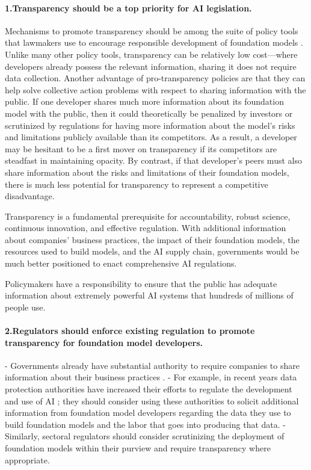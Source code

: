 \documentclass[screen, authorversion, acmsmall]{acmart}
\begin{document}
\paragraph{1.\phantom{X}Transparency should be a top priority for AI legislation.} 
\begin{myitemize}
\item Mechanisms to promote transparency should be among the suite of policy tools that lawmakers use to encourage responsible development of foundation models \citep{engler2023casc, hacker2023gpt}.
Unlike many other policy tools, transparency can be relatively low cost---where developers already possess the relevant information, sharing it does not require data collection. 
Another advantage of pro-transparency policies are that they can help solve collective action problems with respect to sharing information with the public. 
If one developer shares much more information about its foundation model with the public, then it could theoretically be penalized by investors or scrutinized by regulations for having more information about the model's risks and limitations publicly available than its competitors. 
As a result, a developer may be hesitant to be a first mover on transparency if its competitors are steadfast in maintaining opacity. 
By contrast, if that developer's peers must also share information about the risks and limitations of their foundation models, there is much less potential for transparency to represent a competitive disadvantage. 
\item Transparency is a fundamental prerequisite for accountability, robust science, continuous innovation, and effective regulation. 
With additional information about companies' business practices, the impact of their foundation models, the resources used to build models, and the AI supply chain, governments would be much better positioned to enact comprehensive AI regulations. 
\item Policymakers have a responsibility to ensure that the public has adequate information about extremely powerful AI systems that hundreds of millions of people use. 
\end{myitemize}
\paragraph{2.\phantom{X}Regulators should enforce existing regulation to promote transparency for foundation model developers.} 
-  Governments already have substantial authority to require companies to share information about their business practices \cite{ho2012fudging, hess2019ttrap, irion2022algoff}.
- For example, in recent years data protection authorities have increased their efforts to regulate the development and use of AI \citep{zanfir-f2023fpf}; they should consider using these authorities to solicit additional information from foundation model developers regarding the data they use to build foundation models and the labor that goes into producing that data.
- Similarly, sectoral regulators should consider scrutinizing the deployment of foundation models within their purview and require transparency where appropriate.
\end{document}
